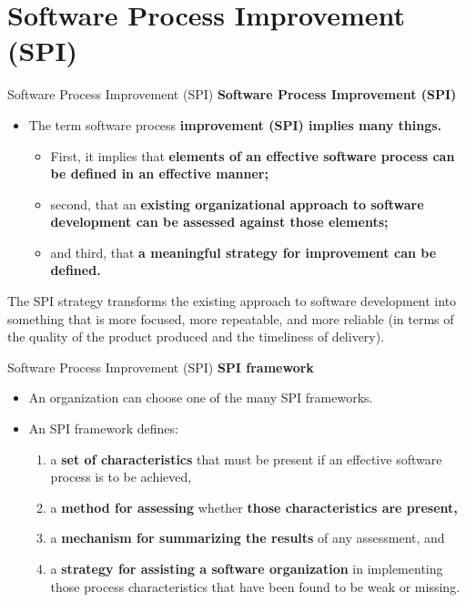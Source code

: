 \documentclass{beamer}
\begin{document}
\section{Software Process Improvement (SPI)}
\begin{frame}{Software Process Improvement (SPI)}
	\textbf{Software Process Improvement (SPI)}
	\begin{itemize}
		\item The term software process\textbf{ improvement (SPI) implies many things. }
		\begin{itemize}
			\item First, it implies that \textbf{elements of an effective software process can be defined in an effective manner; }
			\item second, that an \textbf{existing organizational approach to software development can be assessed against those elements;} 
			\item and third, that \textbf{a meaningful strategy for improvement can be defined. }
		\end{itemize}
	\end{itemize}
The SPI strategy transforms the existing approach to software development into something that is more focused, more repeatable, and more reliable (in terms of the quality of the product produced and the timeliness of delivery).

\end{frame}
\begin{frame}{Software Process Improvement (SPI)}
	\textbf{SPI framework}
	\begin{itemize}
		\item An organization can choose one of the many SPI frameworks.
		\item An SPI framework defines:
		\begin{enumerate}
			\item a \textbf{set of characteristics} that must be present if an effective software process is to be achieved,
			\item a \textbf{method for assessing} whether \textbf{those characteristics are present,}
			\item a \textbf{mechanism for summarizing the results }of any assessment, and 
			\item a \textbf{strategy for assisting a software organization} in implementing those process characteristics that 
			have been found to be weak or missing.

		\end{enumerate}
	\end{itemize}
\end{frame}
\end{document}
